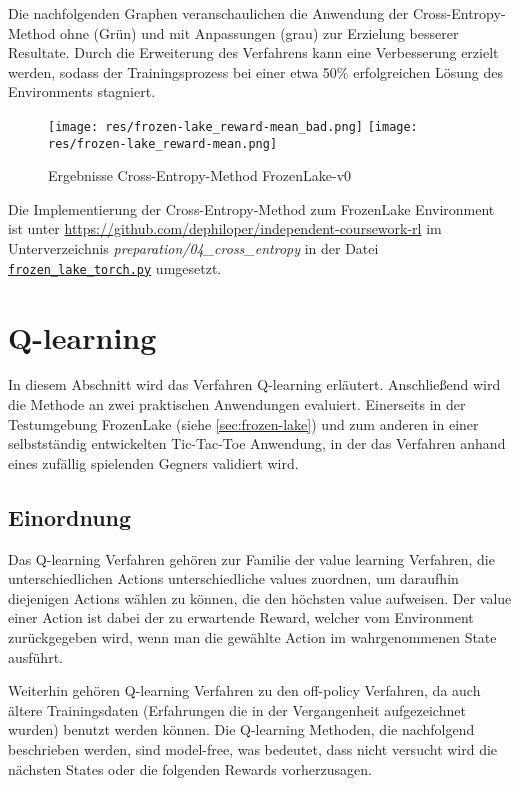 \documentclass[11pt]{scrartcl}
\begin{document}
Die nachfolgenden Graphen veranschaulichen die Anwendung der Cross-Entropy-Method ohne (Grün)
und mit Anpassungen (grau) zur Erzielung besserer Resultate. Durch die Erweiterung des
Verfahrens kann eine Verbesserung erzielt werden, sodass der Trainingsprozess bei einer
etwa 50\% erfolgreichen Lösung des Environments stagniert.

\begin{figure}[htp]
\centering
\texttt{[image: res/frozen-lake\_reward-mean\_bad.png]}
\texttt{[image: res/frozen-lake\_reward-mean.png]}
\caption{Ergebnisse Cross-Entropy-Method FrozenLake-v0}
\label{fig:frozen-lake_cross-entropy}
\end{figure}

Die Implementierung der Cross-Entropy-Method zum FrozenLake Environment ist unter
\url{https://github.com/dephiloper/independent-coursework-rl} im Unterverzeichnis 
\textit{preparation/04\_cross\_entropy} in der Datei 
\href{https://github.com/dephiloper/independent-coursework-rl/blob/master/preparation/04_cross_entropy/frozen_lake_torch.py}{\nolinkurl{frozen\_lake\_torch.py}} umgesetzt.
\newpage


\section{Q-learning}
In diesem Abschnitt wird das Verfahren Q-learning erläutert. Anschließend wird die Methode
an zwei praktischen Anwendungen evaluiert. Einerseits in der Testumgebung FrozenLake
(siehe \autoref{sec:frozen-lake}) und zum anderen in einer selbstständig entwickelten
Tic-Tac-Toe Anwendung, in der das Verfahren anhand eines zufällig spielenden Gegners
validiert wird.


\subsection{Einordnung}
Das Q-learning Verfahren gehören zur Familie der value learning Verfahren, die
unterschiedlichen Actions unterschiedliche values zuordnen, um daraufhin diejenigen Actions
wählen zu können, die den höchsten value aufweisen. Der value einer Action ist dabei der
zu erwartende Reward, welcher vom Environment zurückgegeben wird, wenn man die gewählte
Action im wahrgenommenen State ausführt.

Weiterhin gehören Q-learning Verfahren zu den off-policy Verfahren, da auch ältere
Trainingsdaten (Erfahrungen die in der Vergangenheit aufgezeichnet wurden) benutzt
werden können. Die Q-learning Methoden, die nachfolgend beschrieben werden, sind
model-free, was bedeutet, dass nicht versucht wird die nächsten States oder die
folgenden Rewards vorherzusagen.
\end{document}
